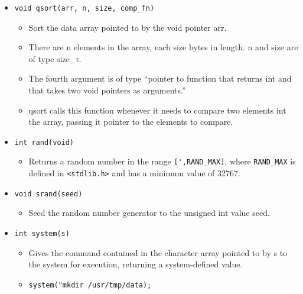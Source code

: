 \begin{itemize}
    \item \texttt{void qsort(arr, n, size, comp_fn)}
        \begin{itemize}
            \item Sort the data array pointed to by the void pointer arr. 
            \item There are n elements in the array, each size bytes in length. n and size are of type size\_t.
            \item The fourth argument is of type ``pointer to function that returns int and that takes two void pointers as arguments.''
            \item qsort calls this function whenever it needs to compare two elements int the array, passing it pointer to the elements to compare.
        \end{itemize}
    
    \item \texttt{int rand(void)}
        \begin{itemize}
            \item Returns a random number in the range \verb|[',RAND_MAX]|, where \verb|RAND_MAX| is defined in \verb|<stdlib.h>| and has a minimum value of 32767.
        \end{itemize}
    
    \item \texttt{void srand(seed)}
        \begin{itemize}
            \item Seed the random number generator to the unsigned int value seed.
        \end{itemize}
    
    \item \texttt{int system(s)}
        \begin{itemize}
            \item Gives the command contained in the character array pointed to by s to the system for execution, returning a system-defined value.
            \item \texttt{system("mkdir /usr/tmp/data);}
        \end{itemize}
\end{itemize}

